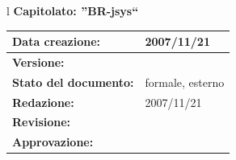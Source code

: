 \documentclass[11pt,titlepage,a4paper]{report}
\begin{document}
\begin{center}
\thispagestyle{plain}
\begin{table}[htbp]
\large{
\begin{tabular}{l}
\Large{\textbf{\textsf{Capitolato: ''BR-jsys``}}} \\
\begin{tabular}{||p{6cm}||p{6cm}||} \hline
\textbf{Data creazione:} & 2007/11/21 \\ \hline
\textbf{Versione:} & \lv \\ \hline
\textbf{Stato del documento:} & formale, esterno \\ \hline
\textbf{Redazione:} &  2007/11/21 \\ \hline
\textbf{Revisione:} &    \\ \hline
\textbf{Approvazione:}  & \\ \hline
\end{tabular} \\
\end{tabular}
}
\end{table}


\end{center}
\end{document}
